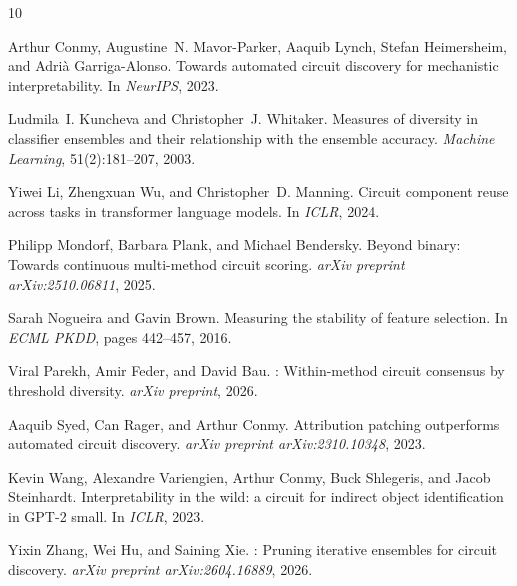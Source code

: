 \documentclass[11pt,a4paper]{article}
\begin{document}
\begin{thebibliography}{10}

Arthur Conmy, Augustine~N. Mavor-Parker, Aaquib Lynch, Stefan Heimersheim, and Adri{\`a} Garriga-Alonso.
\newblock Towards automated circuit discovery for mechanistic interpretability.
\newblock In \emph{NeurIPS}, 2023.

Ludmila~I. Kuncheva and Christopher~J. Whitaker.
\newblock Measures of diversity in classifier ensembles and their relationship with the ensemble accuracy.
\newblock \emph{Machine Learning}, 51(2):181--207, 2003.

Yiwei Li, Zhengxuan Wu, and Christopher~D. Manning.
\newblock Circuit component reuse across tasks in transformer language models.
\newblock In \emph{ICLR}, 2024.

Philipp Mondorf, Barbara Plank, and Michael Bendersky.
\newblock Beyond binary: Towards continuous multi-method circuit scoring.
\newblock \emph{arXiv preprint arXiv:2510.06811}, 2025.

Sarah Nogueira and Gavin Brown.
\newblock Measuring the stability of feature selection.
\newblock In \emph{ECML PKDD}, pages 442--457, 2016.

Viral Parekh, Amir Feder, and David Bau.
: Within-method circuit consensus by threshold diversity.
\newblock \emph{arXiv preprint}, 2026.

Aaquib Syed, Can Rager, and Arthur Conmy.
\newblock Attribution patching outperforms automated circuit discovery.
\newblock \emph{arXiv preprint arXiv:2310.10348}, 2023.

Kevin Wang, Alexandre Variengien, Arthur Conmy, Buck Shlegeris, and Jacob Steinhardt.
\newblock Interpretability in the wild: a circuit for indirect object identification in {GPT}-2 small.
\newblock In \emph{ICLR}, 2023.

Yixin Zhang, Wei Hu, and Saining Xie.
: Pruning iterative ensembles for circuit discovery.
\newblock \emph{arXiv preprint arXiv:2604.16889}, 2026.

\end{thebibliography}
\end{document}
